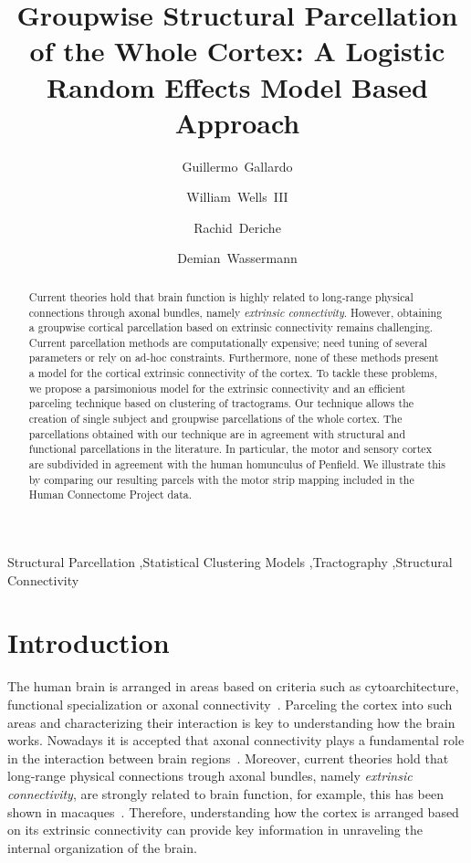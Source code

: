 \begin{frontmatter}
%
\title{Groupwise Structural Parcellation of the Whole Cortex: A Logistic Random Effects Model Based Approach}
%
\author[nice]{Guillermo~Gallardo}
\author[harvard]{William~Wells~III}
\author[nice]{Rachid~Deriche}
\author[nice]{Demian~Wassermann}
%
\address[nice]{Universit\'e C\^ote d'Azur, Inria, France}
\address[harvard]{Harvard Medical School, Boston, Massachusetts, USA}
%
\begin{abstract}
Current theories hold that brain function is highly related to long-range
physical connections through axonal bundles, namely \textit{extrinsic connectivity}.
However, obtaining a groupwise cortical parcellation based on extrinsic connectivity
remains challenging. Current parcellation methods are computationally expensive;
need tuning of several parameters or rely on ad-hoc constraints. Furthermore,
none of these methods present a model for the cortical extrinsic connectivity
of the cortex.
To tackle these problems, we propose a parsimonious model for the 
extrinsic connectivity and an efficient parceling technique based on
clustering of tractograms. Our technique allows the creation of single subject
and groupwise parcellations of the whole cortex. The parcellations obtained with
our technique are in agreement with structural and functional parcellations
in the literature. In particular, the motor and sensory cortex are subdivided
in agreement with the human homunculus of Penfield. We illustrate this by comparing
our resulting parcels with the motor strip mapping included in the Human
Connectome Project data.
\end{abstract}
%
\begin{keyword}
Structural Parcellation \sep Statistical Clustering Models \sep Tractography
\sep Structural Connectivity
\end{keyword}
%
\end{frontmatter}
%
\section{Introduction}
%
The human brain is arranged in areas based on criteria such as cytoarchitecture,
functional specialization or axonal connectivity~\citep{Brodmann1909, Thirion2014,
ThiebautdeSchotten2016}. Parceling the cortex into such areas and 
characterizing their interaction is key to understanding how the brain works.
Nowadays it is accepted that axonal connectivity plays a fundamental role in the
interaction between brain regions~\citep{Schmahmann2006}. Moreover, current theories
hold that long-range physical connections trough axonal bundles,
namely \textit{extrinsic connectivity}, are strongly related to brain function, for example,
this has been shown in macaques~\citep{Passingham2002}. Therefore, understanding
how the cortex is arranged based on its extrinsic connectivity can
provide key information in unraveling the internal organization of the brain.

